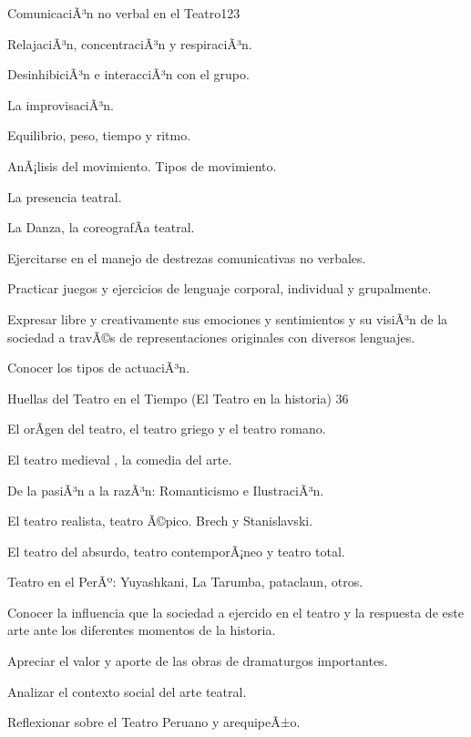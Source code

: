 \begin{syllabus}
\begin{unit}{ComunicaciÃ³n no verbal en el Teatro}{}{12}{3}
\begin{topics}
	\item RelajaciÃ³n, concentraciÃ³n y respiraciÃ³n.
	\item DesinhibiciÃ³n e interacciÃ³n con el grupo.
	\item La improvisaciÃ³n. 
	\item Equilibrio, peso, tiempo y ritmo. 
	\item AnÃ¡lisis del movimiento. Tipos de movimiento.
	\item La presencia teatral.
	\item La Danza, la coreografÃ­a teatral.     

\end{topics}
\begin{unitgoals}
	\item Ejercitarse en el manejo de destrezas comunicativas no verbales.
	\item Practicar juegos y ejercicios de lenguaje  corporal, individual y grupalmente.
	\item Expresar libre y creativamente sus emociones y sentimientos y su visiÃ³n de la sociedad  a travÃ©s de representaciones originales con diversos lenguajes. 
	\item Conocer los tipos de actuaciÃ³n.
\end{unitgoals}
\end{unit}

\begin{unit}{Huellas del Teatro en el Tiempo  (El Teatro en la historia) }{}{3}{6}
\begin{topics}
	\item El orÃ­gen del teatro, el teatro griego y el teatro romano.
	\item El teatro medieval , la comedia del arte.
	\item De la pasiÃ³n a la razÃ³n: Romanticismo e IlustraciÃ³n.
	\item El teatro realista, teatro Ã©pico. Brech  y  Stanislavski.
	\item El teatro del absurdo, teatro contemporÃ¡neo y teatro total.
	\item Teatro en el PerÃº: Yuyashkani, La Tarumba, pataclaun, otros.
\end{topics}
\begin{unitgoals}
	\item Conocer la influencia que la sociedad a ejercido en el teatro y la respuesta de este arte ante los diferentes momentos de la historia.
	\item Apreciar el valor y aporte de las obras de dramaturgos importantes. 
	\item Analizar el contexto social del arte teatral.
	\item Reflexionar sobre el Teatro Peruano y arequipeÃ±o.
\end{unitgoals}
\end{unit}


\end{syllabus}
